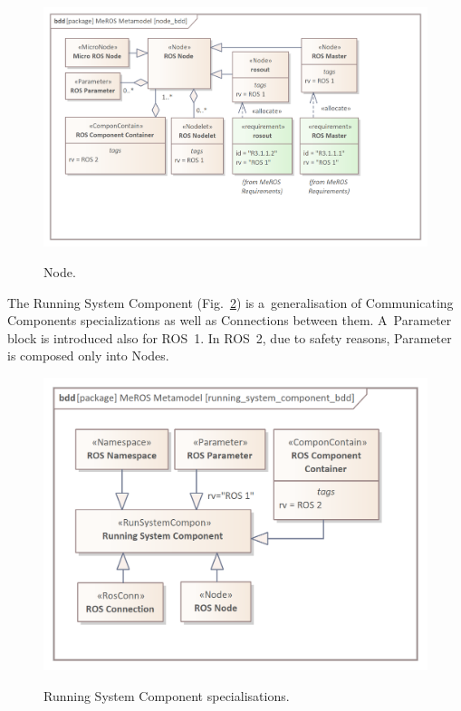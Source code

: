 \documentclass[11pt,oneside,a4paper]{report}
\begin{document}
	 
 	\begin{figure}[H]
	 	\centering
	 	\begin{center}
	 		{\includegraphics[scale=1.0]{img/meros_pkg/node_bdd.png}}
	 	\end{center}
	 	\caption{Node.} 
		 	\label{fig:node_bdd}
	 \end{figure}
	 
	The Running System Component (Fig.~\ref{fig:running_system_component_bdd}) is a~generalisation of Communicating Components specializations as well as Connections between them. A~Parameter block is introduced also for ROS~1. In ROS~2, due to safety reasons, Parameter is composed only into Nodes.
	

	\begin{figure}[H]
		\centering
		\begin{center}
			{\includegraphics[scale=1.0]{img/meros_pkg/running_system_component_bdd.png}}
		\end{center}
		\caption{Running System Component specialisations.} 
		\label{fig:running_system_component_bdd}
	\end{figure} 
	 	 
\end{document}
